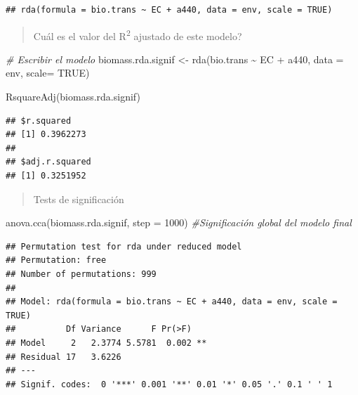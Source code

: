 \documentclass[
]{book}
\newenvironment{Shaded}{\begin{snugshade}}{\end{snugshade}}
\newcommand{\AttributeTok}[1]{\textcolor[rgb]{0.77,0.63,0.00}{#1}}
\newcommand{\CommentTok}[1]{\textcolor[rgb]{0.56,0.35,0.01}{\textit{#1}}}
\newcommand{\ConstantTok}[1]{\textcolor[rgb]{0.00,0.00,0.00}{#1}}
\newcommand{\DecValTok}[1]{\textcolor[rgb]{0.00,0.00,0.81}{#1}}
\newcommand{\FunctionTok}[1]{\textcolor[rgb]{0.00,0.00,0.00}{#1}}
\newcommand{\NormalTok}[1]{#1}
\newcommand{\OtherTok}[1]{\textcolor[rgb]{0.56,0.35,0.01}{#1}}
\newcommand{\SpecialCharTok}[1]{\textcolor[rgb]{0.00,0.00,0.00}{#1}}
\begin{document}
\begin{Shaded}
\end{Shaded}

\begin{verbatim}
## rda(formula = bio.trans ~ EC + a440, data = env, scale = TRUE)
\end{verbatim}

\begin{quote}
Cuál es el valor del R\textsuperscript{2} ajustado de este modelo?
\end{quote}

\begin{Shaded}
\begin{Highlighting}[]
\CommentTok{\# Escribir el modelo}
\NormalTok{biomass.rda.signif }\OtherTok{\textless{}{-}} \FunctionTok{rda}\NormalTok{(bio.trans }\SpecialCharTok{\textasciitilde{}}\NormalTok{ EC }\SpecialCharTok{+}\NormalTok{ a440, }\AttributeTok{data =}\NormalTok{ env, }\AttributeTok{scale=} \ConstantTok{TRUE}\NormalTok{)}


\FunctionTok{RsquareAdj}\NormalTok{(biomass.rda.signif)}
\end{Highlighting}
\end{Shaded}

\begin{verbatim}
## $r.squared
## [1] 0.3962273
## 
## $adj.r.squared
## [1] 0.3251952
\end{verbatim}

\begin{quote}
Tests de significación
\end{quote}

\begin{Shaded}
\begin{Highlighting}[]
\FunctionTok{anova.cca}\NormalTok{(biomass.rda.signif, }\AttributeTok{step =} \DecValTok{1000}\NormalTok{) }\CommentTok{\#Significación global del modelo final}
\end{Highlighting}
\end{Shaded}

\begin{verbatim}
## Permutation test for rda under reduced model
## Permutation: free
## Number of permutations: 999
## 
## Model: rda(formula = bio.trans ~ EC + a440, data = env, scale = TRUE)
##          Df Variance      F Pr(>F)   
## Model     2   2.3774 5.5781  0.002 **
## Residual 17   3.6226                 
## ---
## Signif. codes:  0 '***' 0.001 '**' 0.01 '*' 0.05 '.' 0.1 ' ' 1
\end{verbatim}
\end{document}

